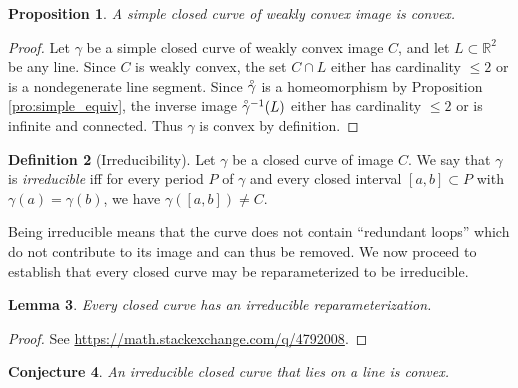 \documentclass{amsart}
\newtheorem{proposition}{Proposition}[section]
\newtheorem{lemma}[proposition]{Lemma}
\newtheorem{conjecture}[proposition]{Conjecture}
\theoremstyle{definition}
\newtheorem{definition}[proposition]{Definition}
\theoremstyle{remark}
\newcommand{\lring}[1]{\accentset{\circ}{#1}}
\begin{document}
\begin{proposition}
    \label{pro:simple_convex}
    A simple closed curve of weakly convex image is convex.
\end{proposition}

\begin{proof}
    Let $\gamma$ be a simple closed curve of weakly convex image $C$,
    and let $L\subset\mathbb{R}^2$ be any line.
    Since $C$ is weakly convex, the set $C\cap L$
    either has cardinality $\le2$ or is a nondegenerate line segment.
    Since $\lring{\gamma}$ is a homeomorphism by Proposition
    \ref{pro:simple_equiv}, the inverse image $\lring{\gamma}^{-1}(L)$
    either has cardinality $\le2$ or is infinite and connected.
    Thus $\gamma$ is convex by definition.
\end{proof}

\begin{definition}[Irreducibility]
    Let $\gamma$ be a closed curve of image $C$.
    We say that $\gamma$ is \emph{irreducible} iff for every period
    $P$ of $\gamma$ and every closed interval $[a,b]\subset P$
    with $\gamma(a)=\gamma(b)$, we have
    $\gamma([a,b])\ne C$.
\end{definition}

Being irreducible means that the curve does not contain
``redundant loops'' which do not contribute to its image
and can thus be removed. We now proceed to establish
that every closed curve may be reparameterized to be
irreducible. %

\begin{lemma}
    \label{lem:irr_exists}
    Every closed curve has an irreducible reparameterization.
\end{lemma}

\begin{proof}
    See \url{https://math.stackexchange.com/q/4792008}.
\end{proof}

\begin{conjecture}
    \label{con:irr_linear_convex}
    An irreducible closed curve that lies on a line is convex.
\end{conjecture}

\end{document}
